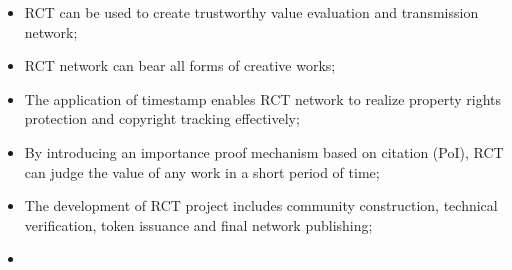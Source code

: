 \documentclass[a4paper,oneside,openany]{tufte-book}
\begin{document}
\begin{itemize}
  \item RCT can be used to create trustworthy value evaluation and transmission network;
  \item RCT network can bear all forms of creative works;
  \item The application of timestamp enables RCT network to realize property rights protection and copyright tracking effectively;
  \item By introducing an importance proof mechanism based on citation (PoI), RCT can judge the value of any work in a short period of time;
  \item The development of RCT project includes community construction, technical verification, token issuance and final network publishing;
  \item \textsf{}



\end{itemize}
\end{document}
